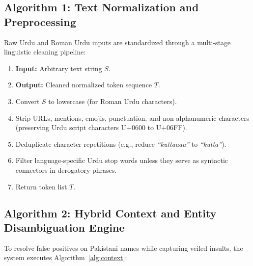 \documentclass[A4paper,12pt]{report}
\theoremstyle{plain}
\theoremstyle{definition}
\theoremstyle{remark}
\numberwithin{equation}{section}
\begin{document}
\subsection{Algorithm 1: Text Normalization and Preprocessing}
Raw Urdu and Roman Urdu inputs are standardized through a multi-stage linguistic cleaning pipeline:
\begin{enumerate}[leftmargin=*]
    \item \textbf{Input:} Arbitrary text string $S$.
    \item \textbf{Output:} Cleaned normalized token sequence $T$.
    \item Convert $S$ to lowercase (for Roman Urdu characters).
    \item Strip URLs, mentions, emojis, punctuation, and non-alphanumeric characters (preserving Urdu script characters U+0600 to U+06FF).
    \item Deduplicate character repetitions (e.g., reduce \textit{``kuttaaaa''} to \textit{``kutta''}).
    \item Filter language-specific Urdu stop words unless they serve as syntactic connectors in derogatory phrases.
    \item Return token list $T$.
\end{enumerate}

\subsection{Algorithm 2: Hybrid Context and Entity Disambiguation Engine}
To resolve false positives on Pakistani names while capturing veiled insults, the system executes Algorithm~\ref{alg:context}:
\end{document}
